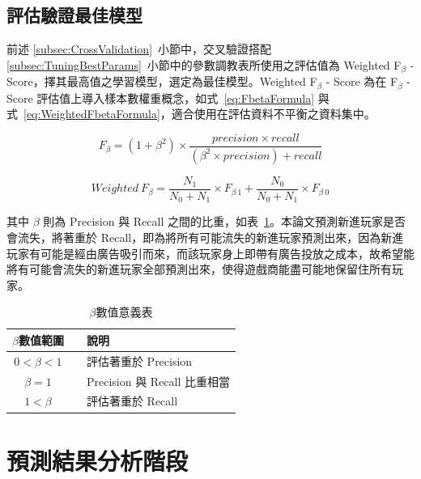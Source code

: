
\subsection{評估驗證最佳模型}
\label{subsec:EvaluateBestModel}

前述 \ref{subsec:CrossValidation}~小節中，交叉驗證搭配 \ref{subsec:TuningBestParams}~小節中的參數調教表所使用之評估值為 Weighted F$_{\beta}$ - Score，擇其最高值之學習模型，選定為最佳模型。Weighted F$_{\beta}$ - Score 為在 F$_{\beta}$ - Score 評估值上導入樣本數權重概念，如式~\ref{eq:FbetaFormula} 與式~\ref{eq:WeightedFbetaFormula}，適合使用在評估資料不平衡之資料集中。

\begin{equation}
  \label{eq:FbetaFormula}
  F_{\beta} = (1 + \beta^2) \times \frac{precision \times recall}{(\beta^2 \times precision) + recall}
\end{equation}

\begin{equation}
  \label{eq:WeightedFbetaFormula}
  Weighted\ F_{\beta} = \frac{N_1}{N_0 + N_1} \times F_{\beta\ 1} + \frac{N_0}{N_0 + N_1} \times F_{\beta\ 0}
\end{equation}

其中 $\beta$ 則為 Precision 與 Recall 之間的比重，如表~\ref{tab:beta}。本論文預測新進玩家是否會流失，將著重於 Recall，即為將所有可能流失的新進玩家預測出來，因為新進玩家有可能是經由廣告吸引而來，而該玩家身上即帶有廣告投放之成本，故希望能將有可能會流失的新進玩家全部預測出來，使得遊戲商能盡可能地保留住所有玩家。

\begin{table}[!htb]
	\centering
	\begin{tabular}{ccl}
		\hline \hline
		$\beta$數值範圍 && 說明 \\
    \hline \hline
    $0 < \beta < 1$ && 評估著重於 Precision \\
    \hline
    $\beta = 1$ && Precision 與 Recall 比重相當 \\
    \hline
    $1 < \beta$ && 評估著重於 Recall \\
    \hline \hline
		\end{tabular}
	\caption[$\beta$數值意義表]{$\beta$數值意義表}
	\label{tab:beta}
\end{table}

\section{預測結果分析階段}

